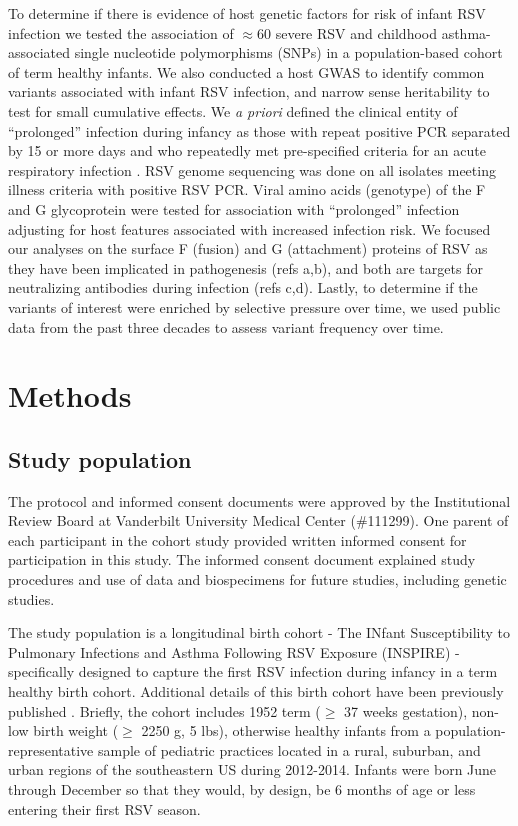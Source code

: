 \documentclass{article} %
\begin{document}
To determine if there is evidence of host genetic factors for risk of infant RSV infection we tested the association of $\approx 60$ severe RSV and childhood asthma-associated single nucleotide polymorphisms (SNPs) in a population-based cohort of term healthy infants.
We also conducted a host GWAS to identify common variants associated with infant RSV infection, and narrow sense heritability to test for small cumulative effects. 
We \textit{a priori} defined the clinical entity of ``prolonged'' infection during infancy as those with repeat positive PCR separated by 15 or more days and who repeatedly met pre-specified criteria for an acute respiratory infection
\citep{okiro2010duration}.
RSV genome sequencing was done on all isolates meeting illness criteria with positive RSV PCR. 
Viral amino acids (genotype) of the F and G glycoprotein were tested for association with ``prolonged'' infection adjusting for host features associated with increased infection risk. 
We focused our analyses on the surface F (fusion) and G (attachment) proteins of RSV as they have been implicated in pathogenesis (refs a,b), and both are targets for neutralizing antibodies during infection (refs c,d).
Lastly, to determine if the variants of interest were enriched by selective pressure over time, we used public data from the past three decades to assess variant frequency over time.

\section{Methods}
\subsection{Study population}
The protocol and informed consent documents were approved by the Institutional Review Board at Vanderbilt University Medical Center (\#111299).  
One parent of each participant in the cohort study provided written informed consent for participation in this study. 
The informed consent document explained study procedures and use of data and biospecimens for future studies, including genetic studies.

The study population is a longitudinal birth cohort - The INfant Susceptibility to Pulmonary Infections and Asthma Following RSV Exposure (INSPIRE) - specifically designed to capture the first RSV infection during infancy in a term healthy birth cohort. 
Additional details of this birth cohort have been previously published 
\citep{larkin_objectives_2015}.
Briefly, the cohort includes 1952 term ($\ge$ 37 weeks gestation), non-low birth weight ($\ge$ 2250 g, 5 lbs), otherwise healthy infants from a population-representative sample of pediatric practices located in a rural, suburban, and urban regions of the southeastern US during 2012-2014. 
Infants were born June through December so that they would, by design, be 6 months of age or less entering their first RSV season. 
\end{document}
